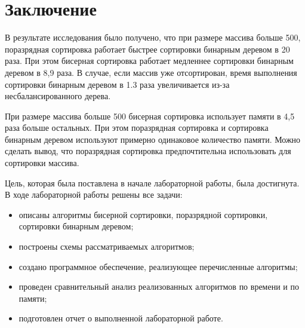 \chapter*{Заключение}



В результате исследования было получено, что при размере массива больше 500, поразрядная сортировка работает быстрее сортировки бинарным деревом в 20 раза.
При этом бисерная сортировка работает медленнее сортировки бинарным деревом в 8,9 раза.
В случае, если массив уже отсортирован, время выполнения сортировки бинарным деревом в 1.3 раза увеличивается из-за несбалансированного дерева.

При размере массива больше 500 бисерная сортировка использует памяти в 4,5 раза больше остальных.
При этом поразрядная сортировка и сортировка бинарным деревом используют примерно одинаковое количество памяти.
Можно сделать вывод, что поразрядная сортировка предпочтительна использовать для сортировки массива.

Цель, которая была поставлена в начале лабораторной работы, была достигнута.
В ходе лабораторной работы решены все задачи:
\begin{itemize}
	\item описаны алгоритмы бисерной сортировки, поразрядной сортировки, сортировки бинарным деревом;
	\item построены схемы рассматриваемых алгоритмов;
	\item создано программное обеспечение, реализующее перечисленные алгоритмы;
	\item проведен сравнительный анализ реализованных алгоритмов по времени и по памяти;
	\item подготовлен отчет о выполненной лабораторной работе.
\end{itemize}